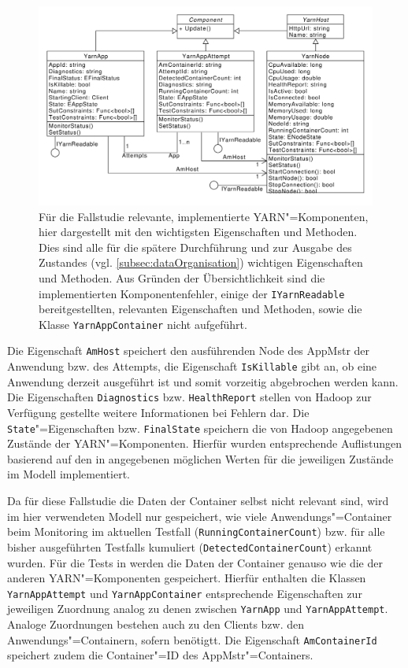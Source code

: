 \begin{figure}[h]
    \includegraphics[width=\columnwidth]{./resources/yarnComponents.pdf}
    \caption[Für die Fallstudie relevante, implementierte \acrshort{YARN}"=Komponenten]
        {Für die Fallstudie relevante, implementierte \acrshort{YARN}"=Komponenten, hier dargestellt mit den wichtigsten Eigenschaften und Methoden.
        Dies sind alle für die spätere Durchführung und zur Ausgabe des Zustandes (vgl. \cref{subsec:dataOrganisation}) wichtigen Eigenschaften und Methoden.
        Aus Gründen der Übersichtlichkeit sind die implementierten Komponentenfehler, einige der \texttt{IYarnReadable} bereitgestellten, relevanten Eigenschaften und Methoden, sowie die Klasse \texttt{YarnAppContainer} nicht aufgeführt.}
    \label{fig:yarnComponentsClassDiagram}
\end{figure}

Die Eigenschaft \texttt{AmHost} speichert den ausführenden Node des \gls{AppMstr} der \gls{Anwendung} bzw. des Attempts, die Eigenschaft \texttt{IsKillable} gibt an, ob eine \gls{Anwendung} derzeit ausgeführt ist und somit vorzeitig abgebrochen werden kann.
Die Eigenschaften \texttt{Diagnostics} bzw. \texttt{HealthReport} stellen von Hadoop zur Verfügung gestellte weitere Informationen bei Fehlern dar.
Die \texttt{State}"=Eigenschaften bzw. \texttt{FinalState} speichern die von Hadoop angegebenen Zustände der \gls{YARN}"=Komponenten.
Hierfür wurden entsprechende Auflistungen basierend auf den in \cite{HadoopRmApi271} angegebenen möglichen Werten für die jeweiligen Zustände im Modell implementiert.

Da für diese Fallstudie die Daten der \gls{Container} selbst nicht relevant sind, wird im hier verwendeten Modell nur gespeichert, wie viele Anwendungs"=Container beim Monitoring im aktuellen \gls{Testfall} (\texttt{RunningContainerCount}) bzw. für alle bisher ausgeführten \glspl{Testfall} kumuliert (\texttt{DetectedContainerCount}) erkannt wurden.
Für die \glspl{Test} in \cite{Eberhardinger2018} werden die Daten der \gls{Container} genauso wie die der anderen \gls{YARN}"=Komponenten gespeichert.
Hierfür enthalten die Klassen \texttt{YarnAppAttempt} und \texttt{YarnAppContainer} entsprechende Eigenschaften zur jeweiligen Zuordnung analog zu denen zwischen \texttt{YarnApp} und \texttt{YarnAppAttempt}.
Analoge Zuordnungen bestehen auch zu den Clients bzw. den Anwendungs"=Containern, sofern benötigtt.
Die Eigenschaft \texttt{AmContainerId} speichert zudem die Container"=ID des \gls{AppMstr}"=Containers.

